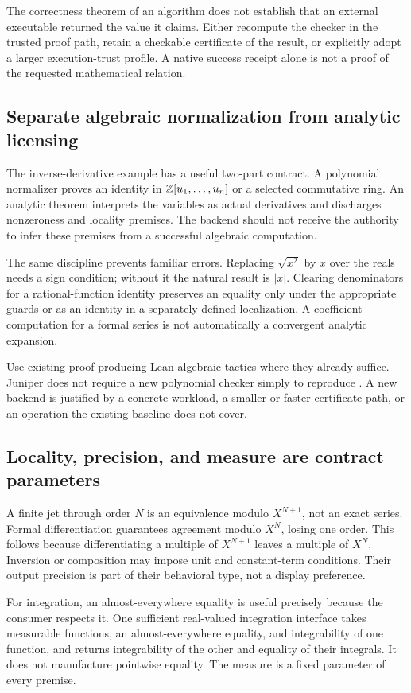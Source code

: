 \documentclass[11pt,a4paper]{article}
\newcommand{\code}[1]{\texttt{\small\detokenize{#1}}}
\theoremstyle{definition}\newtheorem{definition}[theorem]{Definition}
\theoremstyle{remark}\newtheorem{remark}[theorem]{Remark}
\begin{document}
The correctness theorem of an algorithm does not establish that an external executable returned the value it claims. Either recompute the checker in the trusted proof path, retain a checkable certificate of the result, or explicitly adopt a larger execution-trust profile. A native success receipt alone is not a proof of the requested mathematical relation.

\subsection{Separate algebraic normalization from analytic licensing}
The inverse-derivative example has a useful two-part contract. A polynomial normalizer proves an identity in $\mathbb Z[u_1,\ldots,u_n]$ or a selected commutative ring. An analytic theorem interprets the variables as actual derivatives and discharges nonzeroness and locality premises. The backend should not receive the authority to infer these premises from a successful algebraic computation.

The same discipline prevents familiar errors. Replacing $\sqrt{x^2}$ by $x$ over the reals needs a sign condition; without it the natural result is $|x|$. Clearing denominators for a rational-function identity preserves an equality only under the appropriate guards or as an identity in a separately defined localization. A coefficient computation for a formal series is not automatically a convergent analytic expansion.

Use existing proof-producing Lean algebraic tactics where they already suffice. Juniper does not require a new polynomial checker simply to reproduce \code{ring}. A new backend is justified by a concrete workload, a smaller or faster certificate path, or an operation the existing baseline does not cover.

\subsection{Locality, precision, and measure are contract parameters}
A finite jet through order $N$ is an equivalence modulo $X^{N+1}$, not an exact series. Formal differentiation guarantees agreement modulo $X^N$, losing one order. This follows because differentiating a multiple of $X^{N+1}$ leaves a multiple of $X^N$. Inversion or composition may impose unit and constant-term conditions. Their output precision is part of their behavioral type, not a display preference.

For integration, an almost-everywhere equality is useful precisely because the consumer respects it. One sufficient real-valued integration interface takes measurable functions, an almost-everywhere equality, and integrability of one function, and returns integrability of the other and equality of their integrals. It does not manufacture pointwise equality. The measure is a fixed parameter of every premise.
\end{document}

